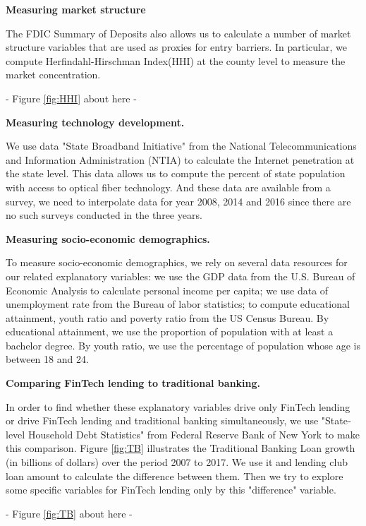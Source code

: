 \documentclass[11pt, a4paper, leqno]{article}
\begin{document}
\textbf{Measuring market structure}

The FDIC Summary of Deposits also allows us to calculate a number of market structure variables that are used as proxies for entry barriers. In particular, we compute Herfindahl-Hirschman Index(HHI) at the county level to measure the market concentration.

\begin{center}
- Figure \ref{fig:HHI} about here -
\end{center}

\textbf{Measuring technology development.} 

We use data "State Broadband Initiative" from the National Telecommunications and Information Administration (NTIA) to calculate the Internet penetration at the state level. 
This data allows us to compute the percent of state population with access to optical fiber technology. And these data are available from a survey, we need to interpolate data for year 2008, 2014 and 2016 since there are no such surveys conducted in the three years.

\textbf{Measuring socio-economic demographics.} 

To measure socio-economic demographics, we rely on several data resources for our related explanatory variables: we use the GDP data from the U.S. Bureau of Economic Analysis to calculate personal income per capita; we use data of unemployment rate from the Bureau of labor statistics; to compute educational attainment, youth ratio and poverty ratio from the US Census Bureau. By educational attainment, we use the proportion of population with at least a bachelor degree. By youth ratio, we use the percentage of population whose age is between 18 and 24.

\textbf{Comparing FinTech lending to traditional banking.}

In order to find whether these explanatory variables drive only FinTech lending or drive FinTech lending and traditional banking simultaneously, we use "State­ level Household Debt Statistics" from Federal Reserve Bank of New York to make this comparison. 
Figure \ref{fig:TB} illustrates the Traditional Banking Loan growth (in billions of dollars) over the period 2007 to 2017. We use it and lending club loan amount to calculate the difference between them. Then we try to explore some specific variables for FinTech lending only by this "difference" variable.

\begin{center}
- Figure \ref{fig:TB} about here -
\end{center}
\end{document}
